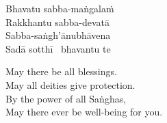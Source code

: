 \begin{pali-hang-continued}
  Bhavatu sabba-maṅgalaṁ\\
  Rakkhantu sabba-devatā\\
  Sabba-saṅgh'ānubhāvena\\
  Sadā sotthī \breathmark\ bhavantu te
\end{pali-hang-continued}

\begin{english-verses}
  May there be all blessings.\\
  May all deities give protection.\\
  By the power of all Saṅghas,\\
  May there ever be well-being for you.
\end{english-verses}

\suttaRef{[Trad]}


